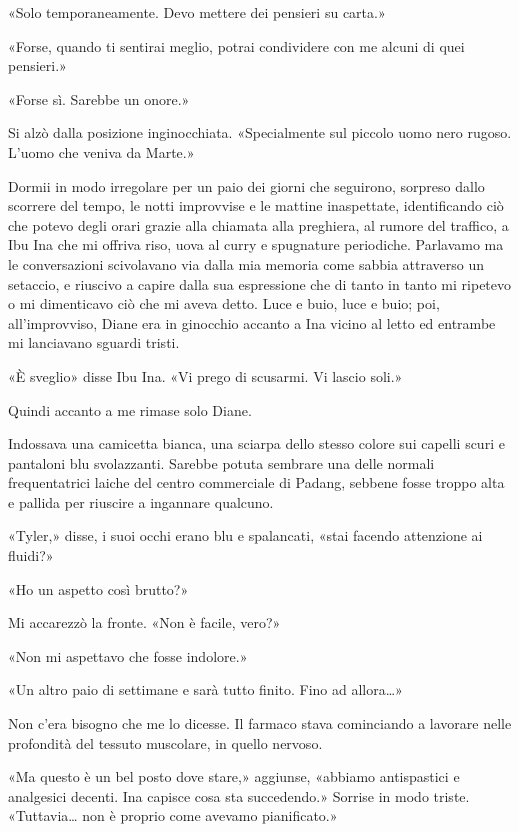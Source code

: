 «Solo temporaneamente. Devo mettere dei pensieri su carta.»

«Forse, quando ti sentirai meglio, potrai condividere con me alcuni di
quei pensieri.»

«Forse sì. Sarebbe un onore.»

Si alzò dalla posizione inginocchiata. «Specialmente sul piccolo uomo
nero rugoso. L'uomo che veniva da Marte.»

\separatorefiori

Dormii in modo irregolare per un paio dei giorni che seguirono, sorpreso
dallo scorrere del tempo, le notti improvvise e le mattine inaspettate,
identificando ciò che potevo degli orari grazie alla chiamata alla
preghiera, al rumore del traffico, a Ibu Ina che mi offriva riso, uova
al curry e spugnature periodiche. Parlavamo ma le conversazioni
scivolavano via dalla mia memoria come sabbia attraverso un setaccio, e
riuscivo a capire dalla sua espressione che di tanto in tanto mi
ripetevo o mi dimenticavo ciò che mi aveva detto. Luce e buio, luce e
buio; poi, all'improvviso, Diane era in ginocchio accanto a Ina vicino
al letto ed entrambe mi lanciavano sguardi tristi.

«È sveglio» disse Ibu Ina. «Vi prego di scusarmi. Vi lascio soli.»

Quindi accanto a me rimase solo Diane.

Indossava una camicetta bianca, una sciarpa dello stesso colore sui
capelli scuri e pantaloni blu svolazzanti. Sarebbe potuta sembrare una
delle normali frequentatrici laiche del centro commerciale di Padang,
sebbene fosse troppo alta e pallida per riuscire a ingannare qualcuno.

«Tyler,» disse, i suoi occhi erano blu e spalancati, «stai facendo
attenzione ai fluidi?»

«Ho un aspetto così brutto?»

Mi accarezzò la fronte. «Non è facile, vero?»

«Non mi aspettavo che fosse indolore.»

«Un altro paio di settimane e sarà tutto finito. Fino ad allora\ldots»

Non c'era bisogno che me lo dicesse. Il farmaco stava cominciando a
lavorare nelle profondità del tessuto muscolare, in quello nervoso.

«Ma questo è un bel posto dove stare,» aggiunse, «abbiamo antispastici e
analgesici decenti. Ina capisce cosa sta succedendo.» Sorrise in modo
triste. «Tuttavia\ldots{} non è proprio come avevamo pianificato.»

